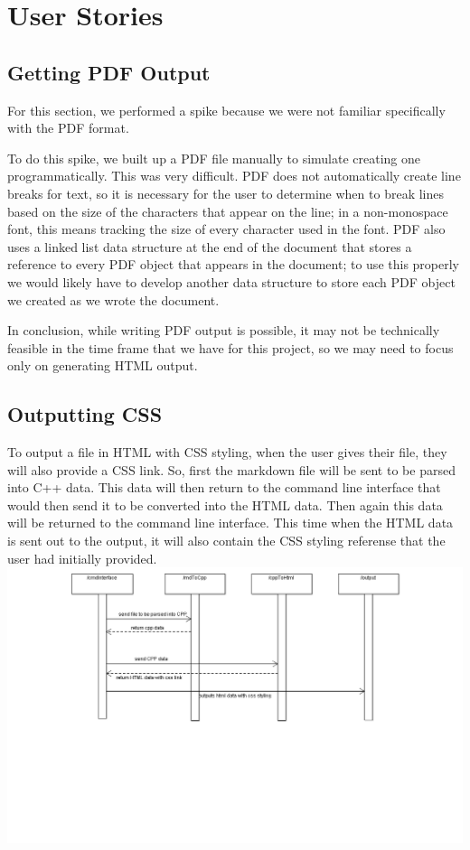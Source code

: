 \section{User Stories}

\subsection{Getting PDF Output}
For this section, we performed a spike because we were not familiar specifically with the PDF format.

To do this spike, we built up a PDF file manually to simulate creating one programmatically. This was very difficult. PDF does not automatically create line breaks for text, so it is necessary for the user to determine when to break lines based on the size of the characters that appear on the line; in a non-monospace font, this means tracking the size of every character used in the font. PDF also uses a linked list data structure at the end of the document that stores a reference to every PDF object that appears in the document; to use this properly we would likely have to develop another data structure to store each PDF object we created as we wrote the document.

In conclusion, while writing PDF output is possible, it may not be technically feasible in the time frame that we have for this project, so we may need to focus only on generating HTML output.

\subsection{Outputting CSS}
To output a file in HTML with CSS styling, when the user gives their file, they will also provide a CSS link. So, first the markdown file will be sent to be parsed into C++ data. This data will then return to the command line interface that would then send it to be converted into the HTML data. Then again this data will be returned to the command line interface. This time when the HTML data is sent out to the output, it will also contain the CSS styling referense that the user had initially provided.  
\hspace{-5cm}\includegraphics[width=700pt]{images/Output.png}

